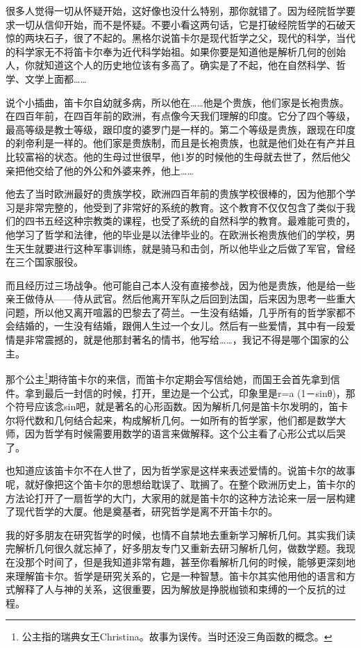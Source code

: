 \documentclass[UTF8, 12pt, a4paper]{ctexrep}
\begin{document}
很多人觉得一切从怀疑开始，这好像也没什么特别，那你就错了。因为经院哲学要求一切从信仰开始，而不是怀疑。不要小看这两句话，它是打破经院哲学的石破天惊的两块石子，很了不起的。黑格尔说笛卡尔是现代哲学之父，现代的科学，当代的科学家无不将笛卡尔奉为近代科学始祖。如果你要是知道他是解析几何的创始人，你就知道这个人的历史地位该有多高了。确实是了不起，他在自然科学、哲学、文学上面都……

说个小插曲，笛卡尔自幼就多病，所以他在……他是个贵族，他们家是长袍贵族。在四百年前，在四百年前的欧洲，有点像今天我们理解的印度。它分了四个等级，最高等级是教士等级，跟印度的婆罗门是一样的。第二个等级是贵族，跟现在印度的刹帝利是一样的。他们家是贵族制，而且是长袍贵族，也就是他们处在有产并且比较富裕的状态。他的生母过世很早，他1岁的时候他的生母就去世了，然后他父亲把他交给了他的外公和外婆来养，他上……

他去了当时欧洲最好的贵族学校，欧洲四百年前的贵族学校很棒的，因为他那个学习是非常完整的，他受到了非常好的系统的教育。这个教育不仅仅包含了类似于我们的四书五经这种宗教类的课程，也受了系统的自然科学的教育。最难能可贵的，他学习了哲学和法律，他的毕业是以法律毕业的。在欧洲长袍贵族他们的学校，男生天生就要进行这种军事训练，就是骑马和击剑，所以他毕业之后做了军官，曾经在三个国家服役。

而且经历过三场战争。他可能自己本人没有直接参战，因为他是贵族，他是给一些亲王做侍从——侍从武官。然后他离开军队之后回到法国，后来因为思考一些重大问题，所以他又离开喧嚣的巴黎去了荷兰。一生没有结婚，几乎所有的哲学家都不会结婚的，一生没有结婚，跟佣人生过一个女儿。然后有一些爱情，其中有一段爱情是非常震撼的，就是他那封著名的情书，他写给……，我记不得是哪个国家的公主。

那个公主\footnote{公主指的瑞典女王Christina。故事为误传。当时还没三角函数的概念。}期待笛卡尔的来信，而笛卡尔定期会写信给她，而国王会首先拿到信件。拿到最后一封信的时候，打开，里边是一个公式，印象里是r=a (1－sinθ)，那个符号应该念sin吧，就是著名的心形函数。因为解析几何是笛卡尔发明的，笛卡尔将代数和几何结合起来，构成解析几何。一如所有的哲学家，他们都是数学大师，因为哲学有时候需要用数学的语言来做解释。这个公主看了心形公式以后哭了。

也知道应该笛卡尔不在人世了，因为哲学家是这样来表述爱情的。说笛卡尔的故事呢，就好像把这个笛卡尔的思想给耽误了、耽搁了。在整个欧洲历史上，笛卡尔的方法论打开了一扇哲学的大门，大家用的就是笛卡尔的这种方法论来一层一层构建了现代哲学的大厦。他是奠基者，研究哲学是离不开笛卡尔的。

我的好多朋友在研究哲学的时候，也情不自禁地去重新学习解析几何。其实我们读完解析几何很久就忘掉了，好多朋友专门又重新去研习解析几何，做数学题。我现在没那个时间了，但是我知道非常有趣，甚至你看解析几何的时候，能够更深刻地来理解笛卡尔。哲学是研究关系的，它是一种智慧。笛卡尔其实他用他的语言和方式解释了人与神的关系，这很重要，因为解放是挣脱枷锁和束缚的一个反抗的过程。
\end{document}
